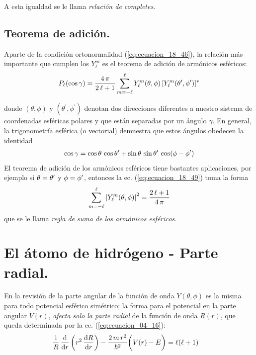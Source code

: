 A esta igualdad se le llama \emph{relación de completes}.

\subsection{Teorema de adición.}

Aparte de la condición ortonormalidad (\ref{eq:ecuacion_18_46}), la relación más importante que cumplen los $Y_{\ell}^{m}$ es el teorema de adición de armónicos esféricos:
\begin{align}
P_{\ell} (\cos \gamma) = \dfrac{4 \, \pi}{2 \, \ell + 1} \sum_{m = -\ell}^{\ell} Y_{\ell}^{m} (\theta, \phi) \, [ Y_{\ell}^{m} (\theta^{\prime}, {\phi}^{\prime})]^{*}
\label{eq:ecuacion_18_49}
\end{align}

donde $(\theta, \phi)$ y $(\theta^{\prime}, \phi^{\prime})$ denotan dos direcciones diferentes a nuestro sistema de coordenadas esféricas polares y que están separadas por un ángulo $\gamma$. En general, la trigonometría esférica (o vectorial) demuestra que estos ángulos obedecen la identidad
\begin{align}
\cos \gamma = \cos \theta \, \cos {\theta}^{\prime} + \sin \theta \, \sin {\theta}^{\prime} \, \cos (\phi - {\phi}^{\prime})
\label{eq:ecuacion_18_50}
\end{align}
El teorema de adición de los armónicos esféricos tiene bastantes aplicaciones, por ejemplo si $\theta = {\theta}^{\prime}$ y $\phi = {\phi}^{\prime}$, entonces la ec. (\ref{eq:ecuacion_18_49}) toma la forma
\begin{align}
\sum_{m = -\ell}^{\ell} \abs{Y_{\ell}^{m} (\theta, \phi)}^{2} = \dfrac{2 \, \ell + 1}{4 \, \pi}
\label{eq:ecuacion_10_262}
\end{align}
que se le llama \emph{regla de suma de los armónicos esféricos}.


 \section{El átomo de hidrógeno - Parte radial.}

En la revisión de la parte angular de la función de onda $Y(\theta, \phi)$ es la misma para todo potencial esférico simétrico; la forma para el potencial en la parte angular $V(r)$, \emph{afecta solo la parte radial} de la función de onda $R(r)$, que queda determinada por la ec. (\ref{eq:ecuacion_04_16}):
\begin{align*}
\dfrac{1}{R} \, \dv{r} \left( r^{2} \, \dv{R}{r} \right) - \dfrac{2 \, m \, r^{2}}{\hbar^{2}} \bigg( V(r) - E \bigg) &= \ell (\ell + 1)
\end{align*}

